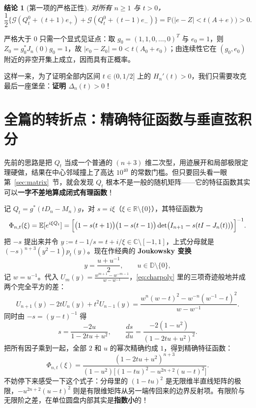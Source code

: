 \documentclass[UTF8,fontset=windows,a4paper,11pt]{ctexart}
\newcommand{\R}{\mathbb{R}}
\newcommand{\C}{\mathbb{C}}
\newcommand{\D}{\mathbb{D}}
\newcommand{\E}{\mathbb{E}}
\newcommand{\Prob}{\mathbb{P}}
\newcommand{\G}{\mathcal{G}}
\newtheorem{claim}{结论}
\begin{document}
\begin{claim}[第一项的严格正性]
    \label{clm:first-term}
    对所有 $n\ge 1$ 与 $t>0$，
    \[
        \frac12\bigl\{\G(Q_t^0+(t+1)e_+)+\G(Q_t^0+(t-1)e_-)\bigr\}
        = \Prob\bigl(|e-Z|<t(A+e)\bigr) > 0.
    \]
\end{claim}

严格大于 $0$ 只需一个显式见证点：取 $g_0=(1,1,0,\dots,0)^T$ 与 $e_0=1$，则 $Z_0=g_0^*J_n(0)g_0=1$，故 $|e_0-Z_0|=0<t(A_0+e_0)$；由连续性它在 $(g_0,e_0)$ 附近的非空开集上成立，因而具有正概率。

这样一来，为了证明全部内区间 $t\in(0,1/2]$ 上的 $H_n'(t)>0$，我们只需要攻克最后一座堡垒：\textbf{证明 $\Delta_n(t)>0$}！

\section{全篇的转折点：精确特征函数与垂直弦积分}
\label{sec:chord}

先前的思路是把 $Q_t$ 当成一个普通的 $(n+3)$ 维二次型，用迹展开和局部极限定理硬做，结果在中心邻域撞上了高达 $10^{40}$ 的常数门槛。但只要回头看一眼第~\ref{sec:matrix}~节，就会发现 $Q_t$ 根本不是一般的随机矩阵——它的特征函数其实可以\textbf{一字不差地算成闭式有理函数}！

记 $Q_t=g^*(tD_n-M_n)g$，对 $s=i\xi$（$\xi\in\R\setminus\{0\}$），其特征函数为
\[
    \Phi_{n,t}(\xi) = \E[e^{i\xi Q_t}]
    = \Bigl[\bigl(1-s(t+1)\bigr)\bigl(1-s(t-1)\bigr)\det\bigl(I_{n+1}-s(tI-J_n(t))\bigr)\Bigr]^{-1}.
\]
把 $-s$ 提出来并令 $y:=t-1/s=t+i/\xi\in\C\setminus[-1,1]$，上式分母就是 $(-s)^{n+3}(y^2-1)p_t(y)$。现在作经典的 \textbf{Joukowsky 变换}
\[
    y = \frac{u+u^{-1}}{2}, \qquad u\in\D\setminus\{0\},
\]
记 $w=u^{-1}$。代入 $U_m(y)=\frac{w^{m+1}-w^{-m-1}}{w-w^{-1}}$，\eqref{eq:charpoly} 里的三项奇迹般地并成两个完全平方的差：
\[
    U_{n+1}(y)-2tU_n(y)+t^2U_{n-1}(y)
    = \frac{w^n(w-t)^2 - w^{-n}(w^{-1}-t)^2}{w-w^{-1}}.
\]
同时由 $-s=(y-t)^{-1}$ 得
\begin{equation}
    s = \frac{-2u}{1-2tu+u^2},
    \qquad
    \frac{ds}{du} = \frac{-2(1-u^2)}{(1-2tu+u^2)^2}.
    \label{eq:s-u}
\end{equation}
把所有因子乘到一起，全部 $2$ 和 $u$ 的幂次精确约成 $1$，得到精确特征函数：
\begin{equation}
    \Phi_{n,t}(\xi)
    = \frac{(1-2tu+u^2)^{n+3}}{(1-u^2)\bigl[(1-tu)^2 - u^{2n+2}(u-t)^2\bigr]}.
    \label{eq:phi-exact}
\end{equation}
不妨停下来感受一下这个式子：分母里的 $(1-tu)^2$ 是无限维半直线矩阵的极限，$-u^{2n+2}(u-t)^2$ 则是有限维矩阵从另一端传回来的边界反射项。有限阶与无限阶之差，在单位圆盘内部其实是\textbf{指数小}的！
\end{document}
